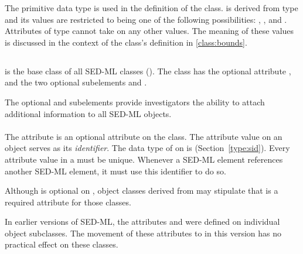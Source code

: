 The  primitive data type is used in the definition of the \Bounds class.   is derived from type  and its values are restricted to being one of the following possibilities: , , and .  Attributes of type  cannot take on any other values.  The meaning of these values is discussed in the context of the \Bounds class's definition in \ref{class:bounds}.



\subsection{}
\label{class:sedBase}
 is the base class of all SED-ML classes (). The  class has the optional attribute \hyperref[sec:metaid]{}, and the two optional subelements \hyperref[sec:notesElement]{} and \hyperref[sec:annotationElement]{}. 

The optional \hyperref[sec:notesElement]{} and \hyperref[sec:annotationElement]{} subelements provide investigators the ability to attach additional information to all SED-ML objects.


\paragraph*{}
\label{sec:id}
The  attribute is an optional attribute on the \SEDBase class.  The  attribute value on an object serves as its \emph{identifier}.  The data type of  on \SEDBase is  (Section~\ref{type:sid}).  Every  attribute value in a \SedDocument must be unique.  Whenever a SED-ML element references another SED-ML element, it must use this identifier to do so.

Although  is optional on \SEDBase, object classes derived from \SEDBase may stipulate that  is a required attribute for those classes.

In earlier versions of SED-ML, the attributes  and  were defined on individual object subclasses.  The movement of these attributes to \SEDBase in this version has no practical effect on these classes.

